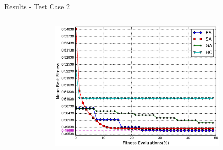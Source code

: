 \documentclass{beamer}
\begin{document}
\begin{frame}{Results - Test Case 2}
\begin{columns}
\begin{column}{.5\columnwidth}
        \end{column}
        \begin{column}{.6\columnwidth}
            \begin{figure}
                \begin{subfigure}{\columnwidth}
                    \includegraphics[width=\columnwidth, height=\columnwidth]{../paper/FIG/tc2_mf}%
                \end{subfigure}\hfill\\%
            \end{figure}
        \end{column}
    \end{columns}
\end{frame}
\end{document}
